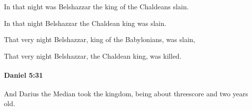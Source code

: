 			In that night was Belshazzar the king of the Chaldeans slain.

			\begin{versebox}
					\item[BHS] 
					\item[LXX] 
					\item[ASV] In that night Belshazzar the Chaldean king was slain.
					\item[NIV] That very night Belshazzar, king of the Babylonians, was slain,
					\item[NRSV] That very night Belshazzar, the Chaldean king, was killed.
			\end{versebox}

		\paragraph{Daniel 5:31} %
			\label{DANIEL-5-31}

			And Darius the Median took the kingdom, being about threescore and two years old.


